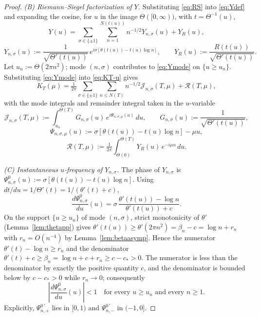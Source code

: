 \documentclass[11pt]{article}
\begin{document}
\begin{proof}
\medskip
\noindent\emph{(B) Riemann--Siegel factorization of $Y$.} Substituting \eqref{eq:RS} into \eqref{eq:Ydef} and expanding the cosine, for $u$ in the image $\Theta([0,\infty))$, with $t=\Theta^{-1}(u)$,
\begin{equation}\label{eq:Ymode}
Y(u)=\sum_{\sigma\in\{\pm1\}}\sum_{n=1}^{N(t(u))}n^{-1/2}Y_{n,\sigma}(u)+Y_R(u),
\end{equation}
\begin{equation}\label{eq:Ynmode}
Y_{n,\sigma}(u):=\frac{1}{\sqrt{\Theta'(t(u))}}\,e^{i\sigma[\theta(t(u))-t(u)\log n]},
\qquad
Y_R(u):=\frac{R(t(u))}{\sqrt{\Theta'(t(u))}}.
\end{equation}
Let $u_n:=\Theta(2\pi n^2)$; mode $(n,\sigma)$ contributes to \eqref{eq:Ymode} on $\{u\ge u_n\}$. Substituting \eqref{eq:Ymode} into \eqref{eq:KT-u} gives
\begin{equation}\label{eq:KTexpand}
K_T(\mu)=\tfrac{1}{2\pi}\sum_{\sigma\in\{\pm1\}}\sum_{n\le N(T)}n^{-1/2}\mathcal J_{n,\sigma}(T,\mu)+\mathcal R(T,\mu),
\end{equation}
with the mode integrals and remainder integral taken in the $u$-variable
\begin{equation}\label{eq:Jnsigma}
\mathcal J_{n,\sigma}(T,\mu):=\int_{u_n}^{\Theta(T)}G_{n,\sigma}(u)\,e^{i\Psi_{n,\sigma,\mu}(u)}\,du,\qquad G_{n,\sigma}(u):=\frac{1}{\sqrt{\Theta'(t(u))}},
\end{equation}
\begin{equation}\label{eq:Psidef}
\Psi_{n,\sigma,\mu}(u):=\sigma[\theta(t(u))-t(u)\log n]-\mu u,
\end{equation}
\begin{equation}\label{eq:RRdef}
\mathcal R(T,\mu):=\tfrac{1}{2\pi}\int_{\Theta(0)}^{\Theta(T)}Y_R(u)\,e^{-i\mu u}\,du.
\end{equation}

\medskip
\noindent\emph{(C) Instantaneous $u$-frequency of $Y_{n,\sigma}$.} The phase of $Y_{n,\sigma}$ is $\Psi^0_{n,\sigma}(u):=\sigma[\theta(t(u))-t(u)\log n]$. Using $dt/du=1/\Theta'(t)=1/(\theta'(t)+c)$,
\begin{equation}\label{eq:instfreq2}
\frac{d\Psi^0_{n,\sigma}}{du}(u)=\sigma\,\frac{\theta'(t(u))-\log n}{\theta'(t(u))+c}.
\end{equation}
On the support $\{u\ge u_n\}$ of mode $(n,\sigma)$, strict monotonicity of $\theta'$ (Lemma~\ref{lem:thetapp}) gives $\theta'(t(u))\ge\theta'(2\pi n^2)=\beta_n-c=\log n+r_n$ with $r_n=O(n^{-4})$ by Lemma~\ref{lem:betaasymp}. Hence the numerator $\theta'(t)-\log n\ge r_n$ and the denominator $\theta'(t)+c\ge\beta_n=\log n+c+r_n\ge c-c_*>0$. The numerator is less than the denominator by exactly the positive quantity $c$, and the denominator is bounded below by $c-c_*>0$ while $r_n\to0$; consequently
\begin{equation}\label{eq:instbd}
\left|\frac{d\Psi^0_{n,\sigma}}{du}(u)\right|<1\quad\text{for every }u\ge u_n\text{ and every }n\ge1.
\end{equation}
Explicitly, $\Psi^{0\,\prime}_{n,+}$ lies in $[0,1)$ and $\Psi^{0\,\prime}_{n,-}$ in $(-1,0]$.


\end{proof}
\end{document}
